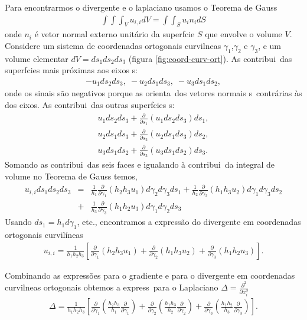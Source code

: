 Para encontrarmos o divergente e o laplaciano usamos o Teorema de Gauss
\begin{eqnarray}
\int\!\!\!\int\!\!\!\int_{V} u_{i,i}dV = \int\!\!\!\int_{S} u_{i}n_{i}dS
\end{eqnarray}
onde $n_{i}$ \'e vetor normal externo unit\'ario da superf\ih cie $S$ que envolve o volume $V$. 
Considere um sistema de coordenadas ortogonais curvil\ih neas $\gamma_{1}$,$\gamma_{2}$ e $\gamma_{3}$, 
e um volume elementar $dV = ds_{1}ds_{2}ds_{3}$ (figura \ref{fig:coord-curv-ort}).
As contribui\coes\ das superf\ih cies mais pr\'oximas aos eixos s\ao:
\begin{eqnarray}
-u_{1}ds_{2}ds_{3}, \; -u_{2}ds_{1}ds_{3}, \; -u_{3}ds_{1}ds_{2},
\end{eqnarray}
onde os sinais s\~ao negativos porque as orienta\coes\ dos vetores normais s\ao\ contr\'arias \`as dos eixos.
As contribui\coes\ das outras superf\ih cies s\ao:
\begin{eqnarray}
u_{1}ds_{2}ds_{3}+\frac{\partial}{\partial s_{1}}(u_{1}ds_{2}ds_{3})ds_{1},\\
u_{2}ds_{1}ds_{3}+\frac{\partial}{\partial s_{2}}(u_{2}ds_{1}ds_{3})ds_{2},\\
u_{3}ds_{1}ds_{2}+\frac{\partial}{\partial s_{3}}(u_{3}ds_{1}ds_{2})ds_{3}.
\end{eqnarray}
Somando as contribui\coes\ das seis faces e igualando \`a contribui\cao\ da integral de volume no Teorema de Gauss temos,
\begin{eqnarray}
u_{i,i} ds_1 ds_2 ds_3 &=& \frac{1}{h_1}\frac{\partial}{\partial \gamma_1} (h_2 h_3 u_1) d\gamma_2 d\gamma_3 ds_1 
 + \frac{1}{h_{2}}\frac{\partial}{\partial \gamma_{2}}(h_{1}h_{3}u_{2})d\gamma_{1}d\gamma_{3}ds_{2} \\ 
&+&\frac{1}{h_{3}}\frac{\partial}{\partial \gamma_{3}}(h_{1}h_{2}u_{3})d\gamma_{1}d\gamma_{2}ds_{3}
\end{eqnarray}
Usando $ds_{1} = h_{1}d\gamma_{1}$, etc., encontramos a express\~ao do divergente em coordenadas
ortogonais curvil\'ineas 
\begin{eqnarray}
u_{i,i}=\frac{1}{h_{1}h_{2}h_{3}}\left[\frac{\partial}{\partial\gamma_{1}}(h_{2}h_{3}u_{1}) 
       +\frac{\partial}{\partial \gamma_{2}}(h_{1}h_{3}u_{2})  
       +\frac{\partial}{\partial \gamma_{3}}(h_{1}h_{2}u_{3})\right].
\end{eqnarray}

Combinando as express\~oes para o gradiente e para o divergente em coordenadas curvil\ih neas ortogonais obtemos a express\ao\ para o 
Laplaciano $\Delta = \frac{\partial^{2}}{\partial x_{i}^{2}}$
\begin{eqnarray}
\Delta = \frac{1}{h_1 h_2 h_3}\left[\frac{\partial}{\partial\gamma_1}\left(\frac{h_2 h_3}{h_1}\frac{\partial}{\partial\gamma_1}\right)
+\frac{\partial}{\partial\gamma_{2}}\left(\frac{h_{1}h_{3}}{h_{2}}\frac{\partial}{\partial\gamma_{2}}\right)+
 \frac{\partial}{\partial\gamma_{3}}\left(\frac{h_{1}h_{2}}{h_{3}}\frac{\partial}{\partial\gamma_{3}}\right)\right].
\end{eqnarray}

